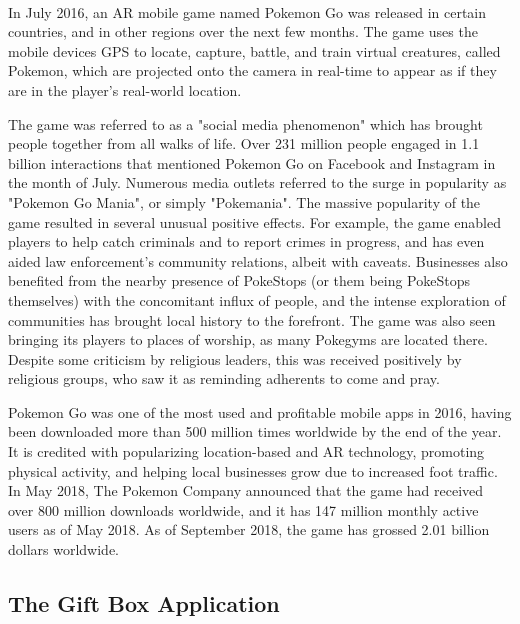 \paragraph{}
In July 2016, an AR mobile game named Pokemon Go was released in certain countries, and in other regions over the next few months. The game uses the mobile devices GPS to locate, capture, battle, and train virtual creatures, called Pokemon, which are projected onto the camera in real-time to appear as if they are in the player's real-world location. 
\par
The game was referred to as a "social media phenomenon" which has brought people together from all walks of life. Over 231 million people engaged in 1.1 billion interactions that mentioned Pokemon Go on Facebook and Instagram in the month of July. Numerous media outlets referred to the surge in popularity as "Pokemon Go Mania", or simply "Pokemania". The massive popularity of the game resulted in several unusual positive effects. For example, the game enabled players to help catch criminals and to report crimes in progress, and has even aided law enforcement's community relations, albeit with caveats. Businesses also benefited from the nearby presence of PokeStops (or them being PokeStops themselves) with the concomitant influx of people, and the intense exploration of communities has brought local history to the forefront. The game was also seen bringing its players to places of worship, as many Pokegyms are located there. Despite some criticism by religious leaders, this was received positively by religious groups, who saw it as reminding adherents to come and pray.
\par
Pokemon Go was one of the most used and profitable mobile apps in 2016, having been downloaded more than 500 million times worldwide by the end of the year. It is credited with popularizing location-based and AR technology, promoting physical activity, and helping local businesses grow due to increased foot traffic. In May 2018, The Pokemon Company announced that the game had received over 800 million downloads worldwide, and it has 147 million monthly active users as of May 2018. As of September 2018, the game has grossed 2.01 billion dollars worldwide.

\subsection{The Gift Box Application}
